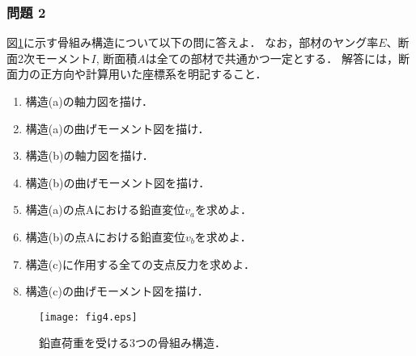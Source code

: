 \documentclass[10pt,a4j]{jarticle}
\begin{document}
\subsubsection*{問題 2}
図\ref{fig:fig4}に示す骨組み構造について以下の問に答えよ． 
なお，部材のヤング率$E$、断面2次モーメント$I$, 断面積$A$は全ての部材で共通かつ一定とする．
解答には，断面力の正方向や計算用いた座標系を明記すること．
\begin{enumerate}
\item
	構造(a)の軸力図を描け．
\item
	構造(a)の曲げモーメント図を描け．
\item
	構造(b)の軸力図を描け．
\item
	構造(b)の曲げモーメント図を描け．
\item
	構造(a)の点Aにおける鉛直変位$v_a$を求めよ．
\item
	構造(b)の点Aにおける鉛直変位$v_b$を求めよ．
\item
	構造(c)に作用する全ての支点反力を求めよ．
\item
	構造(c)の曲げモーメント図を描け．
\end{enumerate}
\begin{figure}[h]
	\begin{center}
	\texttt{[image: fig4.eps]} 
	\end{center}
	\caption{鉛直荷重を受ける3つの骨組み構造．} 
	\label{fig:fig4}
\end{figure}
\end{document}
